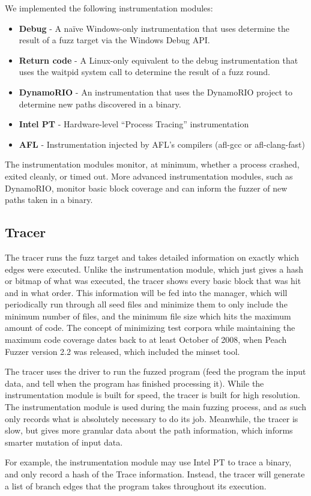 We implemented the following instrumentation modules:
\begin{itemize}[noitemsep]
\item \textbf{Debug} - A na\"ive Windows-only instrumentation that uses determine the
	result of a fuzz target via the Windows Debug API.
\item \textbf{Return code} - A Linux-only equivalent to the debug instrumentation that
	uses the waitpid system call to determine the result of a fuzz round.
\item \textbf{DynamoRIO} - An instrumentation that uses the DynamoRIO project to
	determine new paths discovered in a binary.
\item \textbf{Intel PT} - Hardware-level ``Process Tracing'' instrumentation
\item \textbf{AFL} - Instrumentation injected by AFL's compilers (afl-gcc or
	afl-clang-fast)
\end{itemize}

The instrumentation modules monitor, at minimum, whether a process crashed,
exited cleanly, or timed out. More advanced instrumentation modules, such as
DynamoRIO, monitor basic block coverage and can inform the fuzzer of new paths
taken in a binary.

\subsection{Tracer} \label{Tracer}
The tracer runs the fuzz target and takes detailed information on exactly which
edges were executed.  Unlike the instrumentation module, which just gives a
hash or bitmap of what was executed, the tracer shows every basic block that
was hit and in what order.  This information will be fed into the manager,
which will periodically run through all seed files and minimize them to only
include the minimum number of files, and the minimum file size which hits the
maximum amount of code. The concept of minimizing test corpora while
maintaining the maximum code coverage dates back to at least October of 2008,
when Peach Fuzzer version 2.2 was released, which included the minset
tool.\cite{peach22}

The tracer uses the driver to run the fuzzed program (feed the program the
input data, and tell when the program has finished processing it). While the
instrumentation module is built for speed, the tracer is built for high
resolution.  The instrumentation module is used during the main fuzzing
process, and as such only records what is absolutely necessary to do its job.
Meanwhile, the tracer is slow, but gives more granular data about the path
information, which informs smarter mutation of input data.

For example, the instrumentation module may use Intel PT to trace a binary, and
only record a hash of the Trace information.  Instead, the tracer will generate
a list of branch edges that the program takes throughout its execution.
